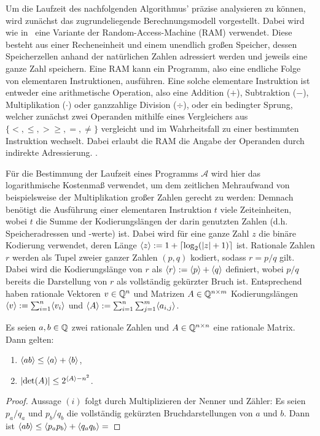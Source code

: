 Um die Laufzeit des nachfolgenden Algorithmus' präzise analysieren zu können, wird zunächst das zugrundeliegende Berechnungsmodell vorgestellt.
Dabei wird wie in~\cite{Gritzmann2013} eine Variante der Random-Access-Machine (RAM) verwendet.
Diese besteht aus einer Recheneinheit und einem unendlich großen Speicher, dessen Speicherzellen anhand der natürlichen Zahlen adressiert werden und jeweils eine ganze Zahl speichern.
Eine RAM kann ein Programm, also eine endliche Folge von elementaren Instruktionen, ausführen.
Eine solche elementare Instruktion ist entweder eine arithmetische Operation, also eine Addition ($+$), Subtraktion ($-$), Multiplikation ($\cdot$) oder ganzzahlige Division ($\div$), oder ein bedingter Sprung, welcher zunächst zwei Operanden mithilfe eines Vergleichers aus $\{ <, \leq, > \geq, =, \neq \}$ vergleicht und im Wahrheitsfall zu einer bestimmten Instruktion wechselt.
Dabei erlaubt die RAM die Angabe der Operanden durch indirekte Adressierung.
.


Für die Bestimmung der Laufzeit eines Programms $\mathcal{A}$ wird hier das logarithmische Kostenmaß verwendet, um dem zeitlichen Mehraufwand von beispielsweise der Multiplikation großer Zahlen gerecht zu werden:
Demnach benötigt die Ausführung einer elementaren Instruktion $t$ viele Zeiteinheiten, wobei $t$ die Summe der Kodierungslängen der darin genutzten Zahlen (d.h. Speicheradressen und -werte) ist.
Dabei wird für eine ganze Zahl $z$ die binäre Kodierung verwendet, deren Länge $\langle z\rangle := 1 + \lceil \log_2(\lvert z\rvert+1) \rceil$ ist.
Rationale Zahlen $r$ werden als Tupel zweier ganzer Zahlen $(p,q)$ kodiert, sodass $r = p/q$ gilt.
Dabei wird die Kodierungslänge von $r$ als $\langle r\rangle:= \langle p\rangle + \langle q\rangle$ definiert, wobei $p/q$ bereits die Darstellung von $r$ als vollständig gekürzter Bruch ist.
Entsprechend haben rationale Vektoren $v\in\mathbb{Q}^n$ und Matrizen $A\in\mathbb{Q}^{n\times m}$ Kodierungslängen $\langle v\rangle := \sum_{i=1}^n \langle v_i\rangle$ und $\langle A\rangle:= \sum_{i=1}^n\sum_{j=1}^m \langle a_{i,j}\rangle$.

\begin{proposition}
	Es seien $a,b\in\mathbb{Q}$ zwei rationale Zahlen und $A\in\mathbb{Q}^{n\times n}$ eine rationale Matrix.
	Dann gelten:
	\begin{enumerate}[label=(\roman*)]
		\item $\langle ab\rangle \leq \langle a\rangle+\langle b\rangle$,
		\item $\lvert\det(A)\rvert \leq 2^{\langle A\rangle - n^2}$.
	\end{enumerate}
\end{proposition}
\begin{proof}
	Aussage $(i)$ folgt durch Multiplizieren der Nenner und Zähler:
	Es seien $p_a/q_a$ und $p_b/q_b$ die vollständig gekürzten Bruchdarstellungen von $a$ und $b$.
	Dann ist $\langle ab\rangle \leq \langle p_a p_b\rangle + \langle q_a q_b\rangle = $
\end{proof}


